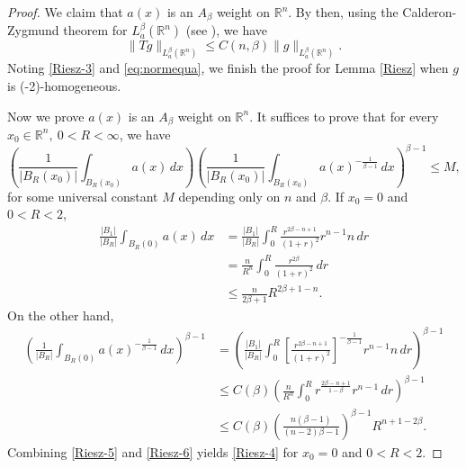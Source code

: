 \documentclass[12pt]{amsart}
\begin{document}
\begin{proof}
		We claim that $a(x)$ is an $A_\beta$ weight on $\mathbb{R}^n$.
		By then, using the Calderon-Zygmund theorem for $L_{a}^\beta (\mathbb{R}^n)$ (see \cite[Chapter V]{Stein93}), we have
		\begin{equation*}
			\|Tg\|_{L_a^\beta(\mathbb{R}^n)} \leq C (n, \beta) \|g\|_{L_a^\beta(\mathbb{R}^n )}.  
		\end{equation*}
		Noting \eqref{Riesz-3} and \eqref{eq:normequa}, 
		we finish the proof for Lemma \ref{Riesz} when $g$ is (-2)-homogeneous.
		
		Now we prove $a(x)$ is an $A_\beta$ weight on $\mathbb{R}^n$.
		It suffices to prove that  for every $ x_0\in \mathbb{R}^n, \ 0<R<\infty$, we have
		\begin{equation}\label{Riesz-4}
			\left( \frac{1}{|B_R(x_0)|} \int_{B_R(x_0)} a(x)\, dx  \right) \left( \frac{1}{|B_R(x_0)|} \int_{B_R(x_0)} a(x)^{-\frac{1}{\beta-1}} \, dx\right)^{\beta-1} \leq M,  
		\end{equation}
		for some universal constant $M$ depending only on $n$ and $\beta$. If $x_0=0$ and $0<R<2$, 
		\begin{equation}\label{Riesz-5}
			\begin{aligned}
				\frac{|B_1|}{|B_R|} \int_{B_R(0)} a(x)\, dx & =
				\frac{|B_1|}{|B_R|} \int_0^R \frac{r^{2\beta-n+1}}{(1+r)^2} r^{n-1} n \, dr   \\
				& = \frac{n}{R^n } \int_0^R \frac{r^{2\beta}}{(1+r)^2} \, dr \\
				& \leq \frac{n}{2\beta+1} R^{2\beta+1 -n}. 
			\end{aligned}
		\end{equation}
		On the other hand, 
		\begin{equation}\label{Riesz-6}
			\begin{aligned}
				\left(  \frac{1}{|B_R| } \int_{B_R(0)} a(x)^{-\frac{1}{\beta-1}} \, dx \right)^{\beta-1} & = \left(  \frac{|B_1|}{|B_R| } 
				\int_0^R  \left[ \frac{r^{2\beta-n+1}}{(1+r)^2} \right]^{-\frac{1}{\beta-1}} r^{n-1}  n \, dr  \right)^{\beta-1}\\
				& \leq C(\beta) \left( \frac{n}{R^n} \int_0^R r^{\frac{2\beta-n+1}{1-\beta}} r^{n-1}\, dr \right)^{\beta-1} \\
				& \leq C(\beta)\left(\frac{n(\beta-1)}{(n-2) \beta - 1 } \right)^{\beta-1} R^{n+1 -2\beta}.
			\end{aligned}
		\end{equation}
		Combining \eqref{Riesz-5} and \eqref{Riesz-6} yields \eqref{Riesz-4} for $x_0= 0$ and $0<R<2$. 
		

\end{proof}
\end{document}

